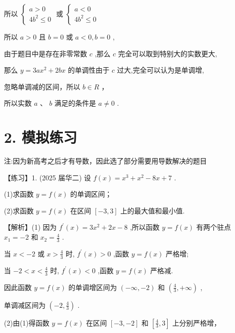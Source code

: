 \documentclass[10pt]{article}
\begin{document}
所以 \(\left\{  \begin{array}{l} a > 0 \\  4{b}^{2} \leq  0 \end{array}\right.\) 或 \(\left\{  \begin{array}{l} a < 0 \\  4{b}^{2} \leq  0 \end{array}\right.\)

所以 \(a > 0\) 且 \(b = 0\) 或 \(a < 0,b = 0\) ,

由于题目中是存在非零常数 \(c\) ,那么 \(c\) 完全可以取到特别大的实数更大,

那么 \(y = {3a}{x}^{2} + {2bx}\) 的单调性由于 \(c\) 过大,完全可以认为是单调增,

忽略单调减的区间，所以 \(b \in  R\) ，

所以实数 \(a\text{ 、 }b\) 满足的条件是 \(a \neq  0\) .

\section*{2. 模拟练习}

注:因为新高考之后才有导数，因此选了部分需要用导数解决的题目

【练习】1. (2025 届华二) 设 \(f\left( x\right)  = {x}^{3} + {x}^{2} - {8x} + 7\) .

(1)求函数 \(y = f\left( x\right)\) 的单调区间；

(2)求函数 \(y = f\left( x\right)\) 在区间 \(\left\lbrack  {-3,3}\right\rbrack\) 上的最大值和最小值.

【解析】(1) 因为 \({f}^{\prime }\left( x\right)  = 3{x}^{2} + {2x} - 8\) ,所以函数 \(y = f\left( x\right)\) 有两个驻点 \({x}_{1} =  - 2\) 和 \({x}_{2} = \frac{4}{3}\) .

当 \(x <  - 2\) 或 \(x > \frac{4}{3}\) 时, \({f}^{\prime }\left( x\right)  > 0\) ,函数 \(y = f\left( x\right)\) 严格增;

当 \(- 2 < x < \frac{4}{3}\) 时, \({f}^{\prime }\left( x\right)  < 0\) ,函数 \(y = f\left( x\right)\) 严格减.

因此函数 \(y = f\left( x\right)\) 的单调增区间为 \(\left( {-\infty , - 2}\right)\) 和 \(\left( {\frac{4}{3}, + \infty }\right)\) ,

单调减区间为 \(\left( {-2,\frac{4}{3}}\right)\) .

(2)由(1)得函数 \(y = f\left( x\right)\) 在区间 \(\left\lbrack  {-3, - 2}\right\rbrack\) 和 \(\left\lbrack  {\frac{4}{3},3}\right\rbrack\) 上分别严格增，
\end{document}
